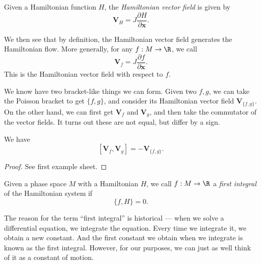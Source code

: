 \documentclass[a4paper]{article}
\begin{document}
\begin{defi}
  Given a Hamiltonian function $H$, the \emph{Hamiltonian vector field} is given by
  \[
    \mathbf{V}_H = J \frac{\partial H}{\partial \mathbf{x}}.
  \]
\end{defi}

We then see that by definition, the Hamiltonian vector field generates the Hamiltonian flow. More generally, for any $f: M \to \R$, we call
\[
  \mathbf{V}_f = J \frac{\partial f}{\partial \mathbf{x}}.
\]
This is the Hamiltonian vector field with respect to $f$.

We know have two bracket-like things we can form. Given two $f, g$, we can take the Poisson bracket to get $\{f, g\}$, and consider its Hamiltonian vector field $\mathbf{V}_{\{f, g\}}$. On the other hand, we can first get $\mathbf{V}_f$ and $\mathbf{V}_g$, and then take the commutator of the vector fields. It turns out these are not equal, but differ by a sign.
\begin{prop}
  We have
  \[
    [\mathbf{V}_f, \mathbf{V}_g] = - \mathbf{\mathbf{V}}_{\{f, g\}}.
  \]
\end{prop}

\begin{proof}
  See first example sheet.
\end{proof}

\begin{defi}
  Given a phase space $M$ with a Hamiltonian $H$, we call $f: M \to \R$ a \emph{first integral} of the Hamiltonian system if
  \[
    \{f, H\} = 0.
  \]
\end{defi}
The reason for the term ``first integral'' is historical --- when we solve a differential equation, we integrate the equation. Every time we integrate it, we obtain a new constant. And the first constant we obtain when we integrate is known as the first integral. However, for our purposes, we can just as well think of it as a constant of motion.
\end{document}
